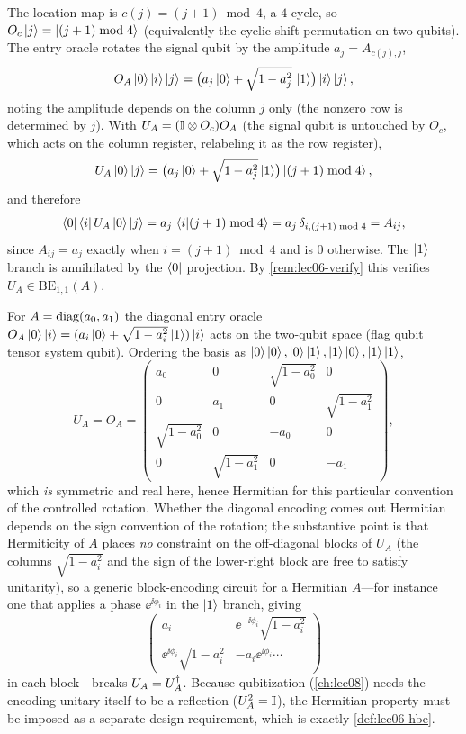 \begin{solution}
The location map is $c(j)=(j+1)\bmod4$, a $4$-cycle, so
$O_c\ket{j}=\ket{(j+1)\bmod4}$ (equivalently the cyclic-shift permutation on two
qubits). The entry oracle rotates the signal qubit by the amplitude
$a_j=A_{c(j),j}$,
\[
  O_A\ket{0}\ket{i}\ket{j}
   =\bigl(a_j\ket{0}+\sqrt{1-a_j^2}\,\ket{1}\bigr)\ket{i}\ket{j},
\]
noting the amplitude depends on the column $j$ only (the nonzero row is determined by
$j$). With $U_A=(\mathbb{I}\otimes O_c)O_A$ (the signal qubit is untouched by $O_c$, which
acts on the column register, relabeling it as the row register),
\[
  U_A\ket{0}\ket{j}
  =\bigl(a_j\ket{0}+\sqrt{1-a_j^2}\ket{1}\bigr)\ket{(j+1)\bmod4},
\]
and therefore
\[
  \bra{0}\bra{i}U_A\ket{0}\ket{j}
  =a_j\,\braket{i|(j+1)\bmod4}=a_j\,\delta_{i,(j+1)\bmod4}=A_{ij},
\]
since $A_{ij}=a_j$ exactly when $i=(j+1)\bmod4$ and is $0$ otherwise. The $\ket{1}$
branch is annihilated by the $\bra{0}$ projection. By \cref{rem:lec06-verify} this
verifies $U_A\in\mathrm{BE}_{1,1}(A)$.
\end{solution}

\begin{solution}
For $A=\operatorname{diag}(a_0,a_1)$ the diagonal entry oracle
$O_A\ket{0}\ket{i}=(a_i\ket{0}+\sqrt{1-a_i^2}\ket{1})\ket{i}$ acts on the two-qubit
space (flag qubit tensor system qubit). Ordering the basis as
$\ket{0}\ket{0},\ket{0}\ket{1},\ket{1}\ket{0},\ket{1}\ket{1}$,
\[
  U_A=O_A=\begin{pmatrix}
    a_0 & 0 & \sqrt{1-a_0^2} & 0\\
    0 & a_1 & 0 & \sqrt{1-a_1^2}\\
    \sqrt{1-a_0^2} & 0 & -a_0 & 0\\
    0 & \sqrt{1-a_1^2} & 0 & -a_1
  \end{pmatrix},
\]
which \emph{is} symmetric and real here, hence Hermitian for this particular
convention of the controlled rotation. Whether the diagonal encoding comes out
Hermitian depends on the sign convention of the rotation; the substantive point is
that Hermiticity of $A$ places \emph{no} constraint on the off-diagonal blocks of
$U_A$ (the columns $\sqrt{1-a_i^2}$ and the sign of the lower-right block are free to
satisfy unitarity), so a generic block-encoding circuit for a Hermitian $A$---for
instance one that applies a phase $\ee^{\ii\phi_i}$ in the $\ket{1}$ branch, giving
\[
  \begin{pmatrix} a_i & \ee^{-\ii\phi_i}\sqrt{1-a_i^2}\\
                  \ee^{\ii\phi_i}\sqrt{1-a_i^2} & -a_i\ee^{\ii\phi_i}\cdots\end{pmatrix}
\]
in each block---breaks $U_A=U_A^{\dagger}$. Because qubitization (\cref{ch:lec08}) needs the
encoding unitary itself to be a reflection ($U_A^2=\mathbb{I}$), the Hermitian property must
be imposed as a separate design requirement, which is exactly \cref{def:lec06-hbe}.
\end{solution}

